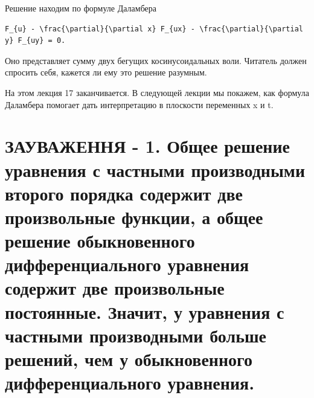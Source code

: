 \documentclass[
  ukrainian,
]{article}
\begin{document}
Решение находим по формуле Даламбера

\begin{verbatim}
F_{u} - \frac{\partial}{\partial x} F_{ux} - \frac{\partial}{\partial y} F_{uy} = 0.
\end{verbatim}

Оно представляет сумму двух бегущих косинусоидальных воли. Читатель
должен спросить себя, кажется ли ему это решение разумным.

На этом лекция 17 заканчивается. В следующей лекции мы покажем, как
формула Даламбера помогает дать интерпретацию в плоскости переменных x и
t.

\section{ЗАУВАЖЕННЯ - 1. Общее решение уравнения с частными производными
второго порядка содержит две произвольные функции, а общее решение
обыкновенного дифференциального уравнения содержит две произвольные
постоянные. Значит, у уравнения с частными производными больше решений,
чем у обыкновенного дифференциального
уравнения.}\label{ux437ux430ux443ux432ux430ux436ux435ux43dux43dux44f---1.-ux43eux431ux449ux435ux435-ux440ux435ux448ux435ux43dux438ux435-ux443ux440ux430ux432ux43dux435ux43dux438ux44f-ux441-ux447ux430ux441ux442ux43dux44bux43cux438-ux43fux440ux43eux438ux437ux432ux43eux434ux43dux44bux43cux438-ux432ux442ux43eux440ux43eux433ux43e-ux43fux43eux440ux44fux434ux43aux430-ux441ux43eux434ux435ux440ux436ux438ux442-ux434ux432ux435-ux43fux440ux43eux438ux437ux432ux43eux43bux44cux43dux44bux435-ux444ux443ux43dux43aux446ux438ux438-ux430-ux43eux431ux449ux435ux435-ux440ux435ux448ux435ux43dux438ux435-ux43eux431ux44bux43aux43dux43eux432ux435ux43dux43dux43eux433ux43e-ux434ux438ux444ux444ux435ux440ux435ux43dux446ux438ux430ux43bux44cux43dux43eux433ux43e-ux443ux440ux430ux432ux43dux435ux43dux438ux44f-ux441ux43eux434ux435ux440ux436ux438ux442-ux434ux432ux435-ux43fux440ux43eux438ux437ux432ux43eux43bux44cux43dux44bux435-ux43fux43eux441ux442ux43eux44fux43dux43dux44bux435.-ux437ux43dux430ux447ux438ux442-ux443-ux443ux440ux430ux432ux43dux435ux43dux438ux44f-ux441-ux447ux430ux441ux442ux43dux44bux43cux438-ux43fux440ux43eux438ux437ux432ux43eux434ux43dux44bux43cux438-ux431ux43eux43bux44cux448ux435-ux440ux435ux448ux435ux43dux438ux439-ux447ux435ux43c-ux443-ux43eux431ux44bux43aux43dux43eux432ux435ux43dux43dux43eux433ux43e-ux434ux438ux444ux444ux435ux440ux435ux43dux446ux438ux430ux43bux44cux43dux43eux433ux43e-ux443ux440ux430ux432ux43dux435ux43dux438ux44f.}
\end{document}
